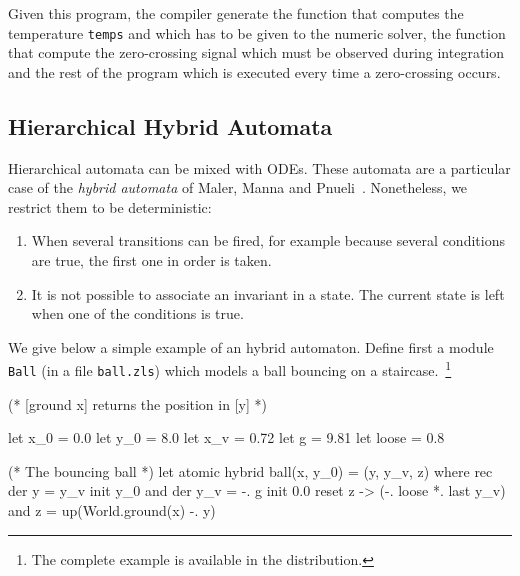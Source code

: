 \documentclass[11pt,titlepage,twoside]{report}
\begin{document}
Given this program, the compiler generate the function that computes
the temperature \verb-temps- and which has to be given to the numeric solver,
the function that compute the zero-crossing signal which must be observed
during integration and the rest of the program which is executed every time
a zero-crossing occurs.
%
%

\subsection{Hierarchical Hybrid Automata\label{hautos}} %

Hierarchical automata can be mixed with ODEs. These automata are a
particular case of the \emph{hybrid automata} of Maler, Manna and
Pnueli~\cite{MalerMannaPnueli:hybrid92}. Nonetheless, we restrict them
to be deterministic:
\begin{enumerate}
  \item When several transitions can be fired, for
    example because several conditions are true, the first one in order is
    taken.
  \item It is not possible to associate an invariant in a state. The current
    state is left when one of the conditions is true.
\end{enumerate}

We give below a simple example of an hybrid automaton. Define first
a module \texttt{Ball} (in a file \texttt{ball.zls}) which models a ball bouncing
on a staircase.~\footnote{The complete example is available in the distribution.}
\begin{chklisting}[withresult]
(* [ground x] returns the position in [y] *)

let x_0 = 0.0
let y_0 = 8.0
let x_v = 0.72
let g = 9.81
let loose = 0.8

(* The bouncing ball *)
let atomic hybrid ball(x, y_0) = (y, y_v, z) where
  rec der y = y_v init y_0
  and der y_v = -. g init 0.0 reset z -> (-. loose *. last y_v)
  and z = up(World.ground(x) -. y)
\end{chklisting}
\end{document}
